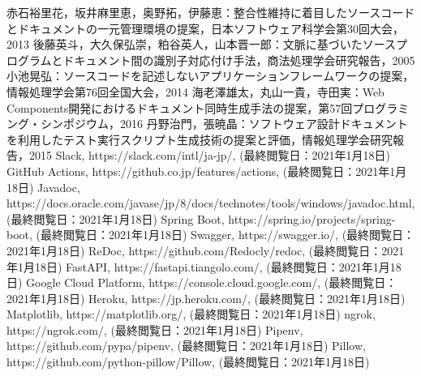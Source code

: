\begin{thebibliography}{9}
     赤石裕里花，坂井麻里恵，奥野拓，伊藤恵：整合性維持に着目したソースコードとドキュメントの一元管理環境の提案，日本ソフトウェア科学会第30回大会，2013
     後藤英斗，大久保弘崇，粕谷英人，山本晋一郎：文脈に基づいたソースプログラムとドキュメント間の識別子対応付け手法，商法処理学会研究報告，2005
     小池晃弘：ソースコードを記述しないアプリケーションフレームワークの提案，情報処理学会第76回全国大会，2014
     海老澤雄太，丸山一貴，寺田実：Web Components開発におけるドキュメント同時生成手法の提案，第57回プログラミング・シンポジウム，2016
     丹野治門，張暁晶：ソフトウェア設計ドキュメントを利用したテスト実行スクリプト生成技術の提案と評価，情報処理学会研究報告，2015
     Slack, https://slack.com/intl/ja-jp/, (最終閲覧日：2021年1月18日)
     GitHub Actions, https://github.co.jp/features/actions, (最終閲覧日：2021年1月18日)
     Javadoc, https://docs.oracle.com/javase/jp/8/docs/technotes/tools/windows/javadoc.html, (最終閲覧日：2021年1月18日)
     Spring Boot, https://spring.io/projects/spring-boot, (最終閲覧日：2021年1月18日)
     Swagger, https://swagger.io/, (最終閲覧日：2021年1月18日)
     ReDoc, https://github.com/Redocly/redoc, (最終閲覧日：2021年1月18日)
     FastAPI, https://fastapi.tiangolo.com/, (最終閲覧日：2021年1月18日)
     Google Cloud Platform, https://console.cloud.google.com/, (最終閲覧日：2021年1月18日)
     Heroku, https://jp.heroku.com/, (最終閲覧日：2021年1月18日)
     Matplotlib, https://matplotlib.org/, (最終閲覧日：2021年1月18日)
     ngrok, https://ngrok.com/, (最終閲覧日：2021年1月18日)
     Pipenv, https://github.com/pypa/pipenv, (最終閲覧日：2021年1月18日)
     Pillow, https://github.com/python-pillow/Pillow, (最終閲覧日：2021年1月18日)
\end{thebibliography}